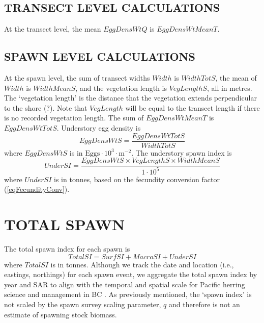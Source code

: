 \documentclass[12pt]{article}
\begin{document}
\subsection{TRANSECT LEVEL CALCULATIONS}

At the transect level, the mean $EggDensWtQ$ is $EggDensWtMeanT$.

\subsection{SPAWN LEVEL CALCULATIONS}

At the spawn level, the sum of transect widths $Width$ is $WidthTotS$, the mean of $Width$ is $WidthMeanS$, and the vegetation length is $VegLengthS$, all in metres.
The `vegetation length' is the distance that the vegetation extends perpendicular to the shore (?).
Note that $VegLength$ will be equal to the transect length if there is no recorded vegetation length.
The sum of $EggDensWtMeanT$ is $EggDensWtTotS$.
Understory egg density is 
\begin{equation}
EggDensWtS = \frac{EggDensWtTotS} {WidthTotS}
\label{eqEggDensityUnder}
\end{equation}
where $EggDensWtS$ is in $\text{Eggs} \cdot 10^{3} \cdot \text{m}^{-2}$.
The understory spawn index is
\begin{equation}
UnderSI = \frac{EggDensWtS \times VegLengthS \times WidthMeanS} {1 \cdot 10^{5}}
\label{eqBiomassUnder}
\end{equation}
where $UnderSI$ is in tonnes, based on the fecundity conversion factor (\autoref{eqFecundityConv}).

\section{TOTAL SPAWN}\label{secTotal}

The total spawn index for each spawn is
\begin{equation}
TotalSI = SurfSI + MacroSI + UnderSI
\label{eqTotalSI}
\end{equation}
where $TotalSI$ is in tonnes.
Although we track the date and location (i.e., eastings, northings) for each spawn event, we aggregate the total spawn index by year and SAR to align with the temporal and spatial scale for Pacific herring science and management in BC \citeyearpar[CSAS][]{CSAS2015b}.
As previously mentioned, the `spawn index' is not scaled by the spawn survey scaling parameter, $q$ \citeyearpar[CSAS][]{CSAS2015b} and therefore is not an estimate of spawning stock biomass.
\end{document}
